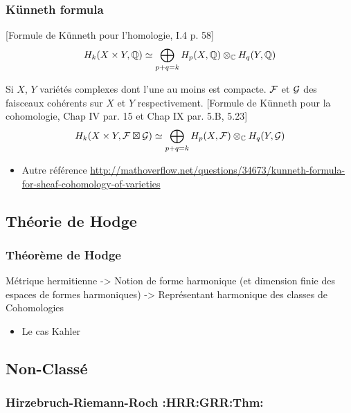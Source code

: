 \documentclass[12pt,makeidx]{amsart}
\begin{document}
\subsubsection{Künneth formula}
\label{sec-1-4-3}

[Formule de Künneth pour l'homologie, \cite{GH} I.4 p. 58]
\begin{equation}\label{Kunneth}
H_{k}(X\times Y,\mathbb{Q}) \simeq \bigoplus_{p+q=k} H_p(X,\mathbb{Q}) \otimes_{\mathbb{C}} H_q(Y,\mathbb{Q})
\end{equation}

Si $X$, $Y$ variétés complexes dont l'une au moins est compacte. $\mathcal{F}$ et $\mathcal{G}$ des faisceaux cohérents sur $X$ et $Y$ respectivement.
[Formule de Künneth pour la cohomologie, \cite{Demailly} Chap IV par. 15 et Chap IX par. 5.B, 5.23]
\begin{equation}\label{CoKunneth}
H_{k}(X \times Y,\mathcal{F} \boxtimes \mathcal{G}) \simeq \bigoplus_{p+q=k} H_p(X,\mathcal{F}) \otimes_{\mathbb{C}} H_q(Y,\mathcal{G})
\end{equation}
\begin{itemize}

\item Autre référence \href{http://mathoverflow.net/questions/34673/kunneth-formula-for-sheaf-cohomology-of-varieties}{http://mathoverflow.net/questions/34673/kunneth-formula-for-sheaf-cohomology-of-varieties}
\label{sec-1-4-3-1}%

\end{itemize} %
\subsection{Théorie de Hodge}
\label{sec-1-5}
\subsubsection{Théorème de Hodge}
\label{sec-1-5-1}

Métrique hermitienne
->
Notion de forme harmonique (et dimension finie des espaces de formes harmoniques)
->
Représentant harmonique des classes de Cohomologies
\begin{itemize}

\item Le cas Kahler
\label{sec-1-5-1-1}%
\end{itemize} %
\subsection{Non-Classé}
\label{sec-1-6}
\subsubsection{Hirzebruch-Riemann-Roch \textbf{:HRR:GRR:Thm:}}
\label{sec-1-6-1}
\end{document}
